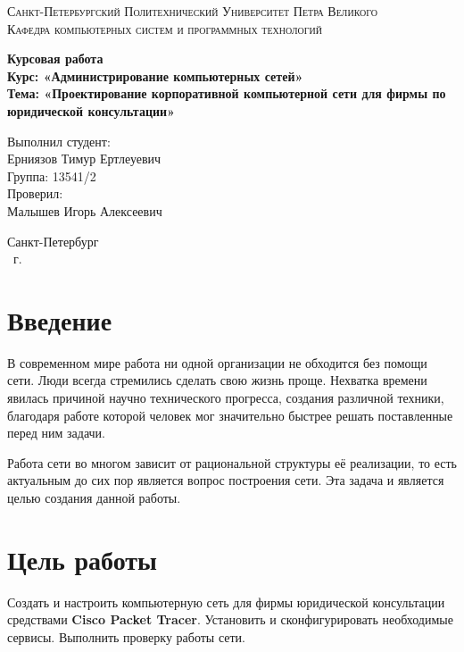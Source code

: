 \documentclass[14pt,a4paper,report]{report}
\begin{document}
\def\contentsname{Содержание}

\begin{titlepage}
	\begin{center}
		\textsc{Санкт-Петербургский Политехнический 
			Университет Петра Великого\\[5mm]
			Кафедра компьютерных систем и программных технологий}
		
		\vfill
		
		\textbf{Курсовая работа\\[3mm]
			Курс: «Администрирование компьютерных сетей»\\[3mm]
			Тема: «Проектирование корпоративной компьютерной сети для фирмы по юридической консультации»\\[35mm]
			}
	\end{center}
	
	\hfill
	\begin{minipage}{.5\textwidth}
		Выполнил студент:\\[2mm] 
		Ерниязов Тимур Ертлеуевич\\
		Группа: 13541/2\\[5mm]
		
		Проверил:\\[2mm] 
		Малышев Игорь Алексеевич
	\end{minipage}
	\vfill
	\begin{center}
		Санкт-Петербург\\ \the\year\ г.
	\end{center}
\end{titlepage}

\tableofcontents
\clearpage


\section*{Введение}
В современном мире работа ни одной организации не обходится без помощи сети. Люди
всегда стремились сделать свою жизнь проще. Нехватка времени явилась причиной
научно технического прогресса, создания различной техники, благодаря работе
которой человек мог значительно быстрее решать поставленные перед ним задачи.

Работа сети во многом зависит от рациональной структуры её реализации, то есть актуальным до сих пор является вопрос построения сети. Эта задача и является целью создания данной работы.

\section{Цель работы}
Создать и настроить компьютерную сеть для фирмы юридической консультации средствами \textbf{Cisco Packet Tracer}. Установить и сконфигурировать необходимые сервисы. Выполнить проверку работы сети.
\end{document}
